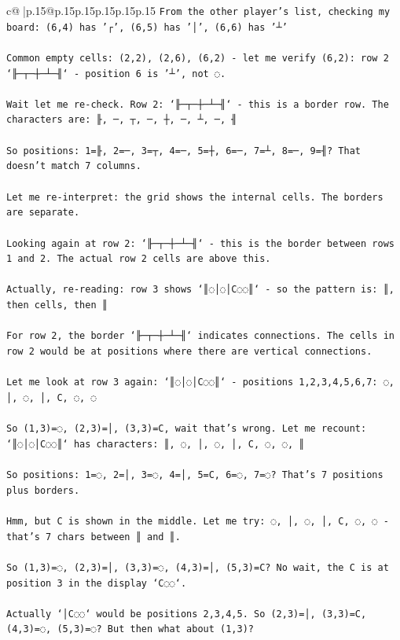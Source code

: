 \documentclass{article}
\begin{document}
{\begin{supertabular}{c@{$\;$}|p{.15\linewidth}@{}p{.15\linewidth}p{.15\linewidth}p{.15\linewidth}p{.15\linewidth}p{.15\linewidth}}
{{{\texttt{From the other player's list, checking my board: (6,4) has '┌', (6,5) has '│', (6,6) has '┴'} \\
\\ 
\texttt{Common empty cells: (2,2), (2,6), (6,2) {-} let me verify (6,2): row 2 `╟─┬─┼─┴─╢` {-} position 6 is '┴', not ◌.} \\
\\ 
\texttt{Wait let me re{-}check. Row 2: `╟─┬─┼─┴─╢` {-} this is a border row. The characters are: ╟, ─, ┬, ─, ┼, ─, ┴, ─, ╢} \\
\\ 
\texttt{So positions: 1=╟, 2=─, 3=┬, 4=─, 5=┼, 6=─, 7=┴, 8=─, 9=╢? That doesn't match 7 columns.} \\
\\ 
\texttt{Let me re{-}interpret: the grid shows the internal cells. The borders are separate.} \\
\\ 
\texttt{Looking again at row 2: `╟─┬─┼─┴─╢` {-} this is the border between rows 1 and 2. The actual row 2 cells are above this.} \\
\\ 
\texttt{Actually, re{-}reading: row 3 shows `║◌│◌│C◌◌║` {-} so the pattern is: ║, then cells, then ║} \\
\\ 
\texttt{For row 2, the border `╟─┬─┼─┴─╢` indicates connections. The cells in row 2 would be at positions where there are vertical connections.} \\
\\ 
\texttt{Let me look at row 3 again: `║◌│◌│C◌◌║` {-} positions 1,2,3,4,5,6,7: ◌, │, ◌, │, C, ◌, ◌} \\
\\ 
\texttt{So (1,3)=◌, (2,3)=│, (3,3)=C, wait that's wrong. Let me recount: `║◌│◌│C◌◌║` has characters: ║, ◌, │, ◌, │, C, ◌, ◌, ║} \\
\\ 
\texttt{So positions: 1=◌, 2=│, 3=◌, 4=│, 5=C, 6=◌, 7=◌? That's 7 positions plus borders.} \\
\\ 
\texttt{Hmm, but C is shown in the middle. Let me try: ◌, │, ◌, │, C, ◌, ◌ {-} that's 7 chars between ║ and ║.} \\
\\ 
\texttt{So (1,3)=◌, (2,3)=│, (3,3)=◌, (4,3)=│, (5,3)=C? No wait, the C is at position 3 in the display `C◌◌`.} \\
\\ 
\texttt{Actually `│C◌◌` would be positions 2,3,4,5. So (2,3)=│, (3,3)=C, (4,3)=◌, (5,3)=◌? But then what about (1,3)?} \\
}}}
\end{supertabular}}
\end{document}
